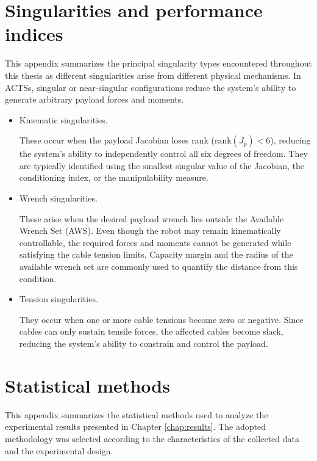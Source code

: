 \chapter{Singularities and performance indices}
\label{chap:singularities}

This appendix summarizes the principal singularity types encountered throughout this thesis as different singularities arise from different physical mechanisms. In ACTSs, singular or near-singular configurations reduce the system's ability to generate arbitrary payload forces and moments. 

\begin{itemize}

\item Kinematic singularities.

These occur when the payload Jacobian loses rank ($\mathrm{rank}(J_p)<6$), reducing the system's ability to independently control all six degrees of freedom. They are typically identified using the smallest singular value of the Jacobian, the conditioning index, or the manipulability measure.

\item Wrench singularities.

These arise when the desired payload wrench lies outside the Available Wrench Set (AWS). Even though the robot may remain kinematically controllable, the required forces and moments cannot be generated while satisfying the cable tension limits. Capacity margin and the radius of the available wrench set are commonly used to quantify the distance from this condition.

\item Tension singularities.

They occur when one or more cable tensions become zero or negative. Since cables can only sustain tensile forces, the affected cables become slack, reducing the system's ability to constrain and control the payload.

\end{itemize}


\chapter{Statistical methods}
\label{app:statistics}
This appendix summarizes the statistical methods used to analyze the experimental results presented in Chapter \ref{chap:results}. The adopted methodology was selected according to the characteristics of the collected data and the experimental design.

